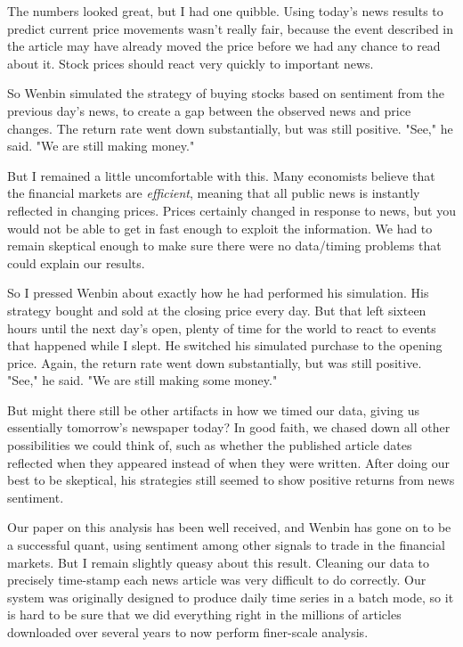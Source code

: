\documentclass[10pt]{article}
\begin{document}
The numbers looked great, but I had one quibble. Using today's news results to predict current price movements wasn't really fair, because the event described in the article may have already moved the price before we had any chance to read about it. Stock prices should react very quickly to important news.

So Wenbin simulated the strategy of buying stocks based on sentiment from the previous day's news, to create a gap between the observed news and price changes. The return rate went down substantially, but was still positive. "See," he said. "We are still making money."

But I remained a little uncomfortable with this. Many economists believe that the financial markets are \textit{efficient}, meaning that all public news is instantly reflected in changing prices. Prices certainly changed in response to news, but you would not be able to get in fast enough to exploit the information. We had to remain skeptical enough to make sure there were no data/timing problems that could explain our results.

So I pressed Wenbin about exactly how he had performed his simulation. His strategy bought and sold at the closing price every day. But that left sixteen hours until the next day's open, plenty of time for the world to react to events that happened while I slept. He switched his simulated purchase to the opening price. Again, the return rate went down substantially, but was still positive. "See," he said. "We are still making some money."

But might there still be other artifacts in how we timed our data, giving us essentially tomorrow's newspaper today? In good faith, we chased down all other possibilities we could think of, such as whether the published article dates reflected when they appeared instead of when they were written. After doing our best to be skeptical, his strategies still seemed to show positive returns from news sentiment.

Our paper on this analysis \cite{ZS10} has been well received, and Wenbin has gone on to be a successful quant, using sentiment among other signals to trade in the financial markets. But I remain slightly queasy about this result. Cleaning our data to precisely time-stamp each news article was very difficult to do correctly. Our system was originally designed to produce daily time series in a batch mode, so it is hard to be sure that we did everything right in the millions of articles downloaded over several years to now perform finer-scale analysis.
\end{document}
